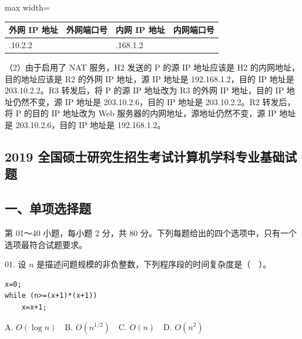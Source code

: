 \documentclass[UTF8,11pt]{ctexart}
\begin{document}
\begin{center}\begin{adjustbox}{max width=\linewidth}\begin{tabular}{|>{\raggedright\arraybackslash}p{\dimexpr(\linewidth-8\tabcolsep-5\arrayrulewidth)/4\relax}|>{\raggedright\arraybackslash}p{\dimexpr(\linewidth-8\tabcolsep-5\arrayrulewidth)/4\relax}|>{\raggedright\arraybackslash}p{\dimexpr(\linewidth-8\tabcolsep-5\arrayrulewidth)/4\relax}|>{\raggedright\arraybackslash}p{\dimexpr(\linewidth-8\tabcolsep-5\arrayrulewidth)/4\relax}|}\hline
外网 IP 地址 & 外网端口号 & 内网 IP 地址 & 内网端口号\\\hline
203.\allowbreak{}10.\allowbreak{}2.\allowbreak{}2 & 80 & 192.\allowbreak{}168.\allowbreak{}1.\allowbreak{}2 & 80\\\hline\end{tabular}\end{adjustbox}\end{center}

（2）由于启用了 NAT 服务，H2 发送的 P 的源 IP 地址应该是 H2 的内网地址，目的地址应该是 R2 的外网 IP 地址，源 IP 地址是 192.168.1.2，目的 IP 地址是 203.10.2.2。R3 转发后，将 P 的源 IP 地址改为 R3 的外网 IP 地址，目的 IP 地址仍然不变，源 IP 地址是 203.10.2.6，目的 IP 地址是 203.10.2.2。R2 转发后，将 P 的目的 IP 地址改为 Web 服务器的内网地址，源地址仍然不变，源 IP 地址是 203.10.2.6，目的 IP 地址是 192.168.1.2。


\subsection*{2019 全国硕士研究生招生考试计算机学科专业基础试题}

\subsection*{一、单项选择题}

第 01～40 小题，每小题 2 分，共 80 分。下列每题给出的四个选项中，只有一个选项最符合试题要求。


01. 设 \(\displaystyle n\) 是描述问题规模的非负整数，下列程序段的时间复杂度是（　）。


\begin{Verbatim}[breaklines,breakanywhere,fontsize=\small]
x=0;
while (n>=(x+1)*(x+1))
    x=x+1;
\end{Verbatim}

A. \(\displaystyle O(\log n)\)　B. \(\displaystyle O(n^{1/2})\)　C. \(\displaystyle O(n)\)　D. \(\displaystyle O(n^2)\)
\end{document}
